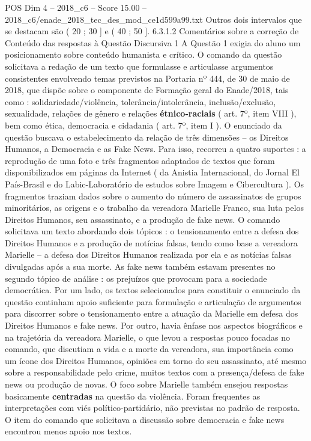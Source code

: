 \begin{textsample}{POS Dim 4 – 2018\_c6 – Score 15.00 – 2018\_c6/enade\_2018\_tec\_des\_mod\_ce1d599a99.txt}
Outros dois intervalos que se destacam são ( 20 ; 30 ] e ( 40 ; 50 ]. 6.3.1.2 Comentários sobre a correção de Conteúdo das respostas à Questão Discursiva 1 A Questão 1 exigia do aluno um posicionamento sobre conteúdo humanista e crítico.
O comando da questão solicitava a redação de um texto que formulasse e articulasse argumentos consistentes envolvendo temas previstos na Portaria nº 444, de 30 de maio de 2018, que dispõe sobre o componente de Formação geral do Enade/2018, tais como : solidariedade/violência, tolerância/intolerância, inclusão/exclusão, sexualidade, relações de gênero e relações \textbf{étnico-raciais} ( art. 7º, item VIII ), bem como ética, democracia e cidadania ( art. 7º, item I ).
O enunciado da questão buscava o estabelecimento da relação de três dimensões – os Direitos Humanos, a Democracia e as Fake News.
Para isso, recorreu a quatro suportes : a reprodução de uma foto e três fragmentos adaptados de textos que foram disponibilizados em páginas da Internet ( da Anistia Internacional, do Jornal El País-Brasil e do Labic-Laboratório de estudos sobre Imagem e Cibercultura ).
Os fragmentos traziam dados sobre o aumento do número de assassinatos de grupos minoritários, as origens e o trabalho da vereadora Marielle Franco, sua luta pelos Direitos Humanos, seu assassinato, e a produção de fake news.
O comando solicitava um texto abordando dois tópicos : o tensionamento entre a defesa dos Direitos Humanos e a produção de notícias falsas, tendo como base a vereadora Marielle – a defesa dos Direitos Humanos realizada por ela e as notícias falsas divulgadas após a sua morte.
As fake news também estavam presentes no segundo tópico de análise : os prejuízos que provocam para a sociedade democrática.
Por um lado, os textos selecionados para constituir o enunciado da questão continham apoio suficiente para formulação e articulação de argumentos para discorrer sobre o tensionamento entre a atuação da Marielle em defesa dos Direitos Humanos e fake news.
Por outro, havia ênfase nos aspectos biográficos e na trajetória da vereadora Marielle, o que levou a respostas pouco focadas no comando, que discutiam a vida e a morte da vereadora, sua importância como um ícone dos Direitos Humanos, opiniões em torno do seu assassinato, até mesmo sobre a responsabilidade pelo crime, muitos textos com a presença/defesa de fake news ou produção de novas.
O foco sobre Marielle também ensejou respostas basicamente \textbf{centradas} na questão da violência.
Foram frequentes as interpretações com viés político-partidário, não previstas no padrão de resposta.
O item do comando que solicitava a discussão sobre democracia e fake news encontrou menos apoio nos textos.

\end{textsample}
